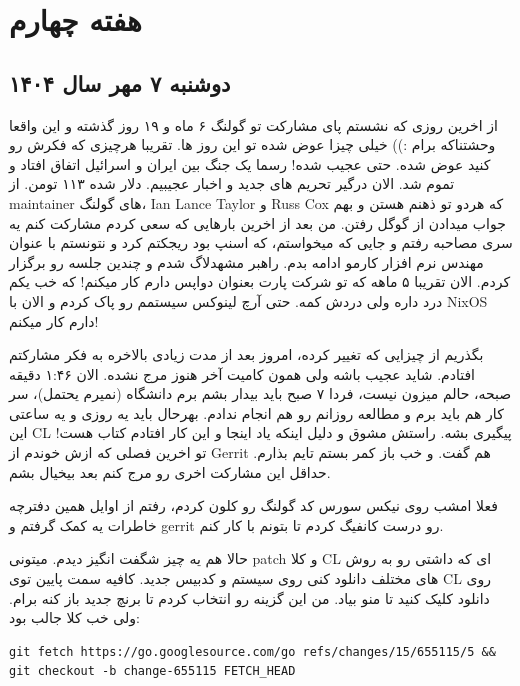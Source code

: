 \section{هفته چهارم}
\subsection{دوشنبه ۷ مهر سال ۱۴۰۴}
از اخرین روزی که نشستم پای مشارکت تو گولنگ ۶ ماه و ۱۹ روز گذشته و این واقعا وحشتناکه برام :))
خیلی چیزا عوض شده تو این روز ها. تقریبا هرچیزی که فکرش رو کنید عوض شده. حتی عجیب شده!
رسما یک جنگ بین ایران و اسرائیل اتفاق افتاد و تموم شد. الان درگیر تحریم های جدید و اخبار عجیبیم. دلار شده ۱۱۳ تومن.
از maintainer های گولنگ، Ian Lance Taylor و Russ Cox که هردو تو ذهنم هستن و بهم جواب میدادن از گوگل رفتن.
من بعد از اخرین بارهایی که سعی کردم مشارکت کنم یه سری مصاحبه رفتم و جایی که میخواستم، که اسنپ بود ریجکتم کرد و نتونستم با عنوان مهندس نرم افزار کارمو
ادامه بدم.
راهبر مشهدلاگ شدم و چندین جلسه رو برگزار کردم.
الان تقریبا ۵ ماهه که تو شرکت پارت بعنوان دواپس دارم کار میکنم! که خب یکم درد داره ولی دردش کمه.
حتی آرچ لینوکس سیستمم رو پاک کردم و الان با NixOS دارم کار میکنم!

بگذریم از چیزایی که تغییر کرده، امروز بعد از مدت زیادی بالاخره به فکر مشارکتم افتادم. شاید عجیب باشه ولی همون کامیت آخر هنوز مرج نشده. الان ۱:۴۶ دقیقه صبحه، حالم میزون نیست،
فردا ۷ صبح باید بیدار بشم برم دانشگاه (نمیرم یحتمل)، سر کار هم باید برم و مطالعه روزانم رو هم انجام ندادم.
بهرحال باید یه روزی و یه ساعتی این CL پیگیری بشه.
راستش مشوق و دلیل اینکه یاد اینجا و این کار افتادم کتاب  هست! تو اخرین فصلی که ازش خوندم از Gerrit هم گفت.
و خب باز کمر بستم تایم بذارم. حداقل این مشارکت اخری رو مرج کنم بعد بیخیال بشم.

فعلا امشب روی نیکس سورس کد گولنگ رو کلون کردم، رفتم از اوایل همین دفترچه خاطرات یه کمک گرفتم و gerrit رو درست کانفیگ کردم تا بتونم با  کار کنم.

حالا هم یه چیز شگفت انگیز دیدم. میتونی patch و کلا CL ای که داشتی رو به روش های مختلف دانلود کنی روی سیستم و کدبیس جدید. کافیه سمت پایین توی CL روی دانلود کلیک کنید تا
منو بیاد. من این گزینه رو انتخاب کردم تا برنچ جدید باز کنه برام. ولی خب کلا جالب بود:

\begin{latin}
\begin{verbatim}
git fetch https://go.googlesource.com/go refs/changes/15/655115/5 && git checkout -b change-655115 FETCH_HEAD
\end{verbatim}
\end{latin}

